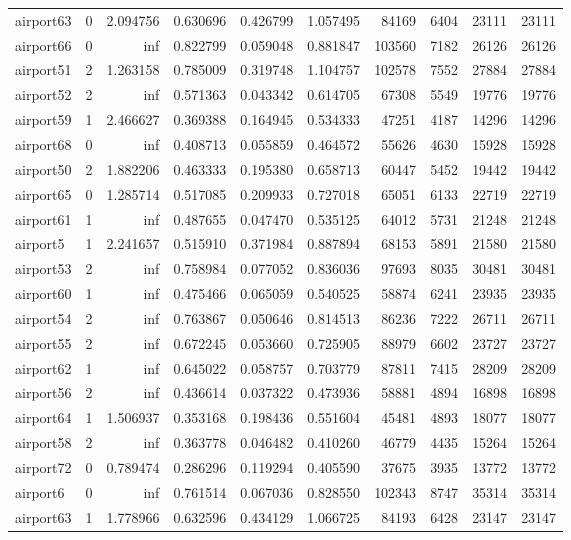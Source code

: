 \begin{longtable}{|l|r|r|r|r|r|r|r|r|r|}
airport63 & 0 & 2.094756 & 0.630696 & 0.426799 & 1.057495 & 84169 & 6404 & 23111 & 23111 \\
airport66 & 0 & inf & 0.822799 & 0.059048 & 0.881847 & 103560 & 7182 & 26126 & 26126 \\
airport51 & 2 & 1.263158 & 0.785009 & 0.319748 & 1.104757 & 102578 & 7552 & 27884 & 27884 \\
airport52 & 2 & inf & 0.571363 & 0.043342 & 0.614705 & 67308 & 5549 & 19776 & 19776 \\
airport59 & 1 & 2.466627 & 0.369388 & 0.164945 & 0.534333 & 47251 & 4187 & 14296 & 14296 \\
airport68 & 0 & inf & 0.408713 & 0.055859 & 0.464572 & 55626 & 4630 & 15928 & 15928 \\
airport50 & 2 & 1.882206 & 0.463333 & 0.195380 & 0.658713 & 60447 & 5452 & 19442 & 19442 \\
airport65 & 0 & 1.285714 & 0.517085 & 0.209933 & 0.727018 & 65051 & 6133 & 22719 & 22719 \\
airport61 & 1 & inf & 0.487655 & 0.047470 & 0.535125 & 64012 & 5731 & 21248 & 21248 \\
airport5 & 1 & 2.241657 & 0.515910 & 0.371984 & 0.887894 & 68153 & 5891 & 21580 & 21580 \\
airport53 & 2 & inf & 0.758984 & 0.077052 & 0.836036 & 97693 & 8035 & 30481 & 30481 \\
airport60 & 1 & inf & 0.475466 & 0.065059 & 0.540525 & 58874 & 6241 & 23935 & 23935 \\
airport54 & 2 & inf & 0.763867 & 0.050646 & 0.814513 & 86236 & 7222 & 26711 & 26711 \\
airport55 & 2 & inf & 0.672245 & 0.053660 & 0.725905 & 88979 & 6602 & 23727 & 23727 \\
airport62 & 1 & inf & 0.645022 & 0.058757 & 0.703779 & 87811 & 7415 & 28209 & 28209 \\
airport56 & 2 & inf & 0.436614 & 0.037322 & 0.473936 & 58881 & 4894 & 16898 & 16898 \\
airport64 & 1 & 1.506937 & 0.353168 & 0.198436 & 0.551604 & 45481 & 4893 & 18077 & 18077 \\
airport58 & 2 & inf & 0.363778 & 0.046482 & 0.410260 & 46779 & 4435 & 15264 & 15264 \\
airport72 & 0 & 0.789474 & 0.286296 & 0.119294 & 0.405590 & 37675 & 3935 & 13772 & 13772 \\
airport6 & 0 & inf & 0.761514 & 0.067036 & 0.828550 & 102343 & 8747 & 35314 & 35314 \\
airport63 & 1 & 1.778966 & 0.632596 & 0.434129 & 1.066725 & 84193 & 6428 & 23147 & 23147 \\

\end{longtable}
